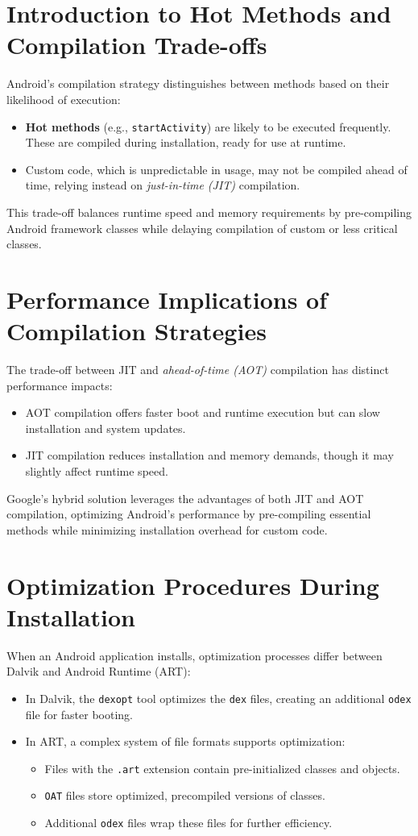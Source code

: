 \documentclass{article}
\begin{document}
\section{Introduction to Hot Methods and Compilation Trade-offs}
Android's compilation strategy distinguishes between methods based on their likelihood of execution:
\begin{itemize}
    \item \textbf{Hot methods} (e.g., \texttt{startActivity}) are likely to be executed frequently. These are compiled during installation, ready for use at runtime.
    \item Custom code, which is unpredictable in usage, may not be compiled ahead of time, relying instead on \textit{just-in-time (JIT)} compilation.
\end{itemize}
This trade-off balances runtime speed and memory requirements by pre-compiling Android framework classes while delaying compilation of custom or less critical classes.

\section{Performance Implications of Compilation Strategies}
The trade-off between JIT and \textit{ahead-of-time (AOT)} compilation has distinct performance impacts:
\begin{itemize}
    \item AOT compilation offers faster boot and runtime execution but can slow installation and system updates.
    \item JIT compilation reduces installation and memory demands, though it may slightly affect runtime speed.
\end{itemize}
Google’s hybrid solution leverages the advantages of both JIT and AOT compilation, optimizing Android’s performance by pre-compiling essential methods while minimizing installation overhead for custom code.

\section{Optimization Procedures During Installation}
When an Android application installs, optimization processes differ between Dalvik and Android Runtime (ART):
\begin{itemize}
    \item In Dalvik, the \texttt{dexopt} tool optimizes the \texttt{dex} files, creating an additional \texttt{odex} file for faster booting.
    \item In ART, a complex system of file formats supports optimization:
    \begin{itemize}
        \item Files with the \texttt{.art} extension contain pre-initialized classes and objects.
        \item \texttt{OAT} files store optimized, precompiled versions of classes.
        \item Additional \texttt{odex} files wrap these files for further efficiency.
    \end{itemize}
\end{itemize}
\end{document}
